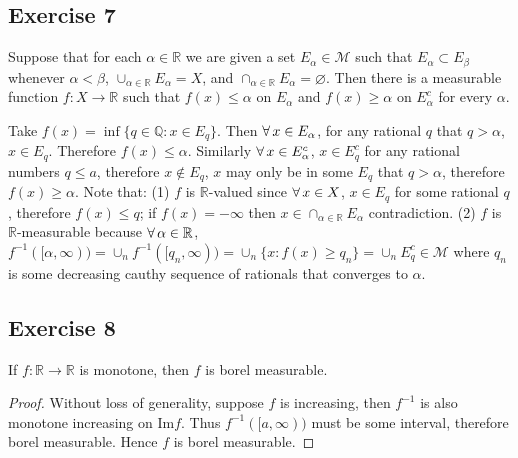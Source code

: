 \subsection*{Exercise 7}
Suppose that for each $\alpha\in\mathbb{R}$ we are given a set $E_\alpha\in\mathcal{M}$ such that $E_\alpha\subset E_\beta$ whenever $\alpha<\beta$, $\cup_{\alpha\in\mathbb{R}}E_\alpha=X$, and $\cap_{\alpha\in\mathbb{R}}E_\alpha=\varnothing$. Then there is a measurable function $f:X\to\mathbb{R}$ such that $f(x)\le\alpha$ on $E_\alpha$ and $f(x)\ge\alpha$ on $E^c_\alpha$ for every $\alpha$.
\begin{solution}
    Take $f(x)=\inf\{q\in\mathbb{Q}:x\in E_q\}$. Then $\forall\, x\in E_\alpha$, for any rational $q$ that $q>\alpha$, $x\in E_q$. Therefore $f(x)\le\alpha$. Similarly $\forall\, x\in E_\alpha^c$, $x\in E_q^c$ for any rational numbers $q\le a$, therefore $x\not\in E_q$, $x$ may only be in some $E_q$ that $q>\alpha$, therefore $f(x)\ge\alpha$. Note that: (1) $f$ is $\mathbb{R}$-valued since $\forall\, x\in X$, $x\in E_q$ for some rational $q$, therefore $f(x)\le q$; if $f(x)=-\infty$ then $x\in\cap_{\alpha\in\mathbb{R}}E_\alpha$ contradiction. (2) $f$ is $\mathbb{R}$-measurable because $\forall\, \alpha\in\mathbb{R}$, $f^{-1}([\alpha,\infty))=\cup_n f^{-1}([q_n,\infty))=\cup_n\{x:f(x)\ge q_n\}=\cup_n E_q^c\in\mathcal{M}$ where $q_n$ is some decreasing cauthy sequence of rationals that converges to $\alpha$.
\end{solution}
\subsection*{Exercise 8}
If $f:\mathbb{R}\to\mathbb{R}$ is monotone, then $f$ is borel measurable.
\begin{proof}
    Without loss of generality, suppose $f$ is increasing, then $f^{-1}$ is also monotone increasing on $\mathrm{Im}f$. Thus $f^{-1}([a,\infty))$ must be some interval, therefore borel measurable. Hence $f$ is borel measurable.
\end{proof}
